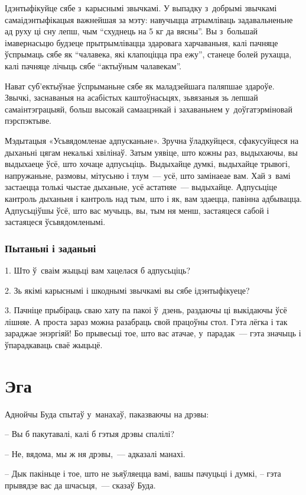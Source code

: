 Ідэнтыфікуйце сябе з~карыснымі звычкамі. У выпадку з~добрымі звычкамі самаідэнтыфікацыя важнейшая за мэту: навучыцца атрымліваць задавальненьне ад руху ці сну лепш, чым ``схуднець на 5 кг да вясны''. Вы з~большай імавернасьцю будзеце прытрымлівацца здаровага харчаваньня, калі пачняце ўспрымаць сябе як ``чалавека, які клапоціцца пра ежу'', станеце болей рухацца, калі пачняце лічыць сябе ``актыўным чалавекам''.

Нават суб'ектыўнае ўспрыманьне сябе як маладзейшага паляпшае здароўе. Звычкі, заснаваныя на асабістых каштоўнасьцях, зьвязаныя зь лепшай самаінтэграцыяй, больш высокай самаацэнкай і захаваньнем у~доўгатэрміновай пэрспэктыве.

Мэдытацыя «Усьвядомленае адпусканьне». Зручна ўладкуйцеся, сфакусуйцеся на дыханьні цягам некалькі хвілінаў. Затым уявіце, што кожны раз, выдыхаючы, вы выдыхаеце ўсё, што хочаце адпусьціць. Выдыхайце думкі, выдыхайце трывогі, напружаньне, размовы, мітусьню і тлум~--- усё, што замінаеае вам. Хай з~вамі застаецца толькі чыстае дыханьне, усё астатняе~--- выдыхайце. Адпусьціце кантроль дыханьня і кантроль над тым, што і як, вам здаецца, павінна адбывацца. Адпусьціўшы ўсё, што вас мучыць, вы, тым ня менш, застаяцеся сабой і застаяцеся ўсьвядомленымі.

\subsubsection{Пытаньні і заданьні}

1. Што ў~сваім жыцьці вам хацелася б адпусьціць?

2. Зь якімі карыснымі і шкоднымі звычкамі вы сябе ідэнтыфікуеце?

3. Пачніце прыбіраць сваю хату па пакоі ў~дзень, раздаючы ці выкідаючы ўсё лішняе. А проста зараз можна разабраць свой працоўны стол. Гэта лёгка і так зараджае энэргіяй! Бо прывесьці тое, што вас атачае, у~парадак~--- гэта значыць і ўпарадкаваць сваё жыцьцё.


\section{Эга}

Аднойчы Буда спытаў у~манахаў, паказваючы на дрэвы: 

– Вы б пакутавалі, калі б гэтыя дрэвы спалілі?

– Не, вядома, мы ж ня дрэвы,~--- адказалі манахі.

– Дык пакіньце і тое, што не зьяўляецца вамі, вашы пачуцьці і думкі, -- гэта прывядзе вас да шчасьця,~--- сказаў Буда.

